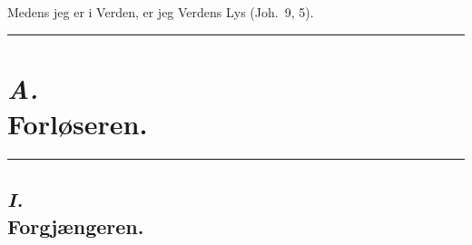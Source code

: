 \documentclass[12pt,a4paper]{book}
\begin{document}
\begin{center}
  {\footnotesize Medens jeg er i Verden, er jeg Verdens Lys (Joh.\ 9, 5).}\\[10pt]
  \rule{0.22\textwidth}{0.4pt}
\end{center}

\section*{\textit{A.}\\[4pt] Forløseren.}

\begin{center}
  \rule{0.08\textwidth}{0.4pt}
\end{center}

\subsection*{\textit{I.}\\[4pt] Forgjængeren.}
\end{document}
